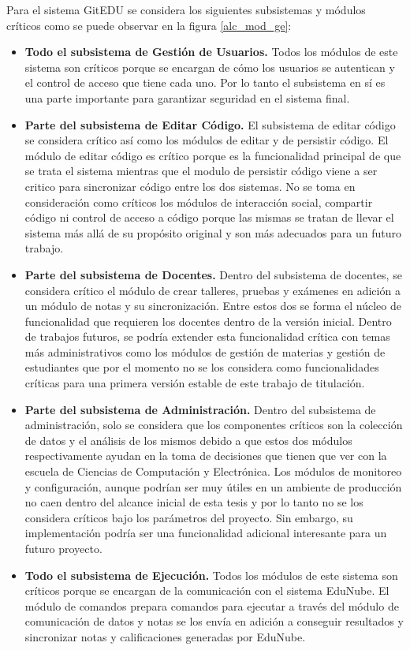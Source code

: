 Para el sistema GitEDU se considera los siguientes subsistemas y módulos críticos como se puede observar en la figura \ref{alc_mod_ge}:
\begin{itemize}
	\item \textbf{Todo el subsistema de Gestión de Usuarios.} Todos los módulos de este sistema son críticos porque se encargan de cómo los usuarios se autentican y el control de acceso que tiene cada uno. Por lo tanto el subsistema en sí es una parte importante para garantizar seguridad en el sistema final.
    \item \textbf{Parte del subsistema de Editar Código.} El subsistema de editar código se considera crítico así como los módulos de editar y de persistir código. El módulo de editar código es crítico porque es la funcionalidad principal de que se trata el sistema mientras que el modulo de persistir código viene a ser critico para sincronizar código entre los dos sistemas. No se toma en consideración como críticos los módulos de interacción social, compartir código ni control de acceso a código porque las mismas se tratan de llevar el sistema más allá de su propósito original y son más adecuados para un futuro trabajo.
    \item \textbf{Parte del subsistema de Docentes.} Dentro del subsistema de docentes, se considera crítico el módulo de crear talleres, pruebas y exámenes en adición a un módulo de notas y su sincronización. Entre estos dos se forma el núcleo de funcionalidad que requieren los docentes dentro de la versión inicial. Dentro de trabajos futuros, se podría extender esta funcionalidad crítica con temas más administrativos como los módulos de gestión de materias y gestión de estudiantes que por el momento no se los considera como funcionalidades críticas para una primera versión estable de este trabajo de titulación.
    \item \textbf{Parte del subsistema de Administración.} Dentro del subsistema de administración, solo se considera que los componentes críticos son la colección de datos y el análisis de los mismos debido a que estos dos módulos respectivamente ayudan en la toma de decisiones que tienen que ver con la escuela de Ciencias de Computación y Electrónica. Los módulos de monitoreo y configuración, aunque podrían ser muy útiles en un ambiente de producción no caen dentro del alcance inicial de esta tesis y por lo tanto no se los considera críticos bajo los parámetros del proyecto. Sin embargo, su implementación podría ser una funcionalidad adicional interesante para un futuro proyecto.
    \item \textbf{Todo el subsistema de Ejecución.} Todos los módulos de este sistema son críticos porque se encargan de la comunicación con el sistema EduNube. El módulo de comandos prepara comandos para ejecutar a través del módulo de comunicación de datos y notas se los envía en adición a conseguir resultados y sincronizar notas y calificaciones generadas por EduNube.
\end{itemize}

